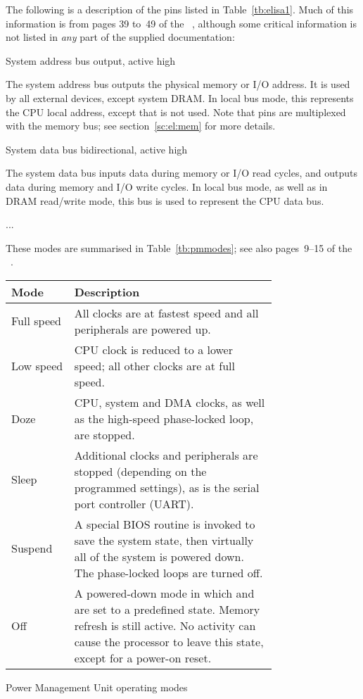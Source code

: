 \documentclass[final]{unswthesis}
\begin{document}
The following is a description of the pins listed in
Table~\ref{tb:elisa1}.  Much of this information is from pages 39 to~49
of the ~\cite{ci:data}, although some critical
information is not listed in \emph{any} part of the supplied
documentation:
%
\begin{pindescr}
	   {System address bus}%
	   {output, active high}

		The system address bus outputs the physical memory or I/O
		address.  It is used by all external devices, except
		system DRAM\@.  In local bus mode, this represents the CPU
		local address, except that  is not used.  Note
		that pins  are multiplexed with the
		memory bus; see section~\ref{sc:el:mem} for more details.

	   {System data bus}%
	   {bidirectional, active high}

		The system data bus inputs data during memory or I/O read
		cycles, and outputs data during memory and I/O write
		cycles.  In local bus mode, as well as in DRAM read/write
		mode, this bus is used to represent the CPU data bus.
\end{pindescr}

...

These modes are summarised in
Table~\ref{tb:pmmodes}; see also pages~9--15 of the ~\cite{ci:data}.
%
\begin{ourtable}
\begin{tabular}{|p{0.15\linewidth}|p{0.6\linewidth}|}
\hline
Mode		&Description\\
\hline\hline
Full speed	&All clocks are at fastest speed and all peripherals are
		powered up.\\\hline
Low speed	&CPU clock is reduced to a lower speed; all other clocks
		are at full speed.\\\hline
Doze		&CPU, system and DMA clocks, as well as the high-speed
		phase-locked loop, are stopped.\\\hline
Sleep		&Additional clocks and peripherals are stopped (depending
		on the programmed settings), as is the serial port
		controller (UART).\\\hline
Suspend		&A special BIOS routine is invoked to save the system
		state, then virtually all of the system is powered down.
		The phase-locked loops are turned off.\\\hline
Off		&A powered-down mode in which \pn{PGP2} and \pn{PGP3} are
		set to a predefined state.  Memory refresh is still
		active.  No activity can cause the processor to leave
		this state, except for a power-on reset.\\
\hline
\end{tabular}
\caption{Power Management Unit operating modes}\label{tb:pmmodes}
\end{ourtable}
\end{document}
